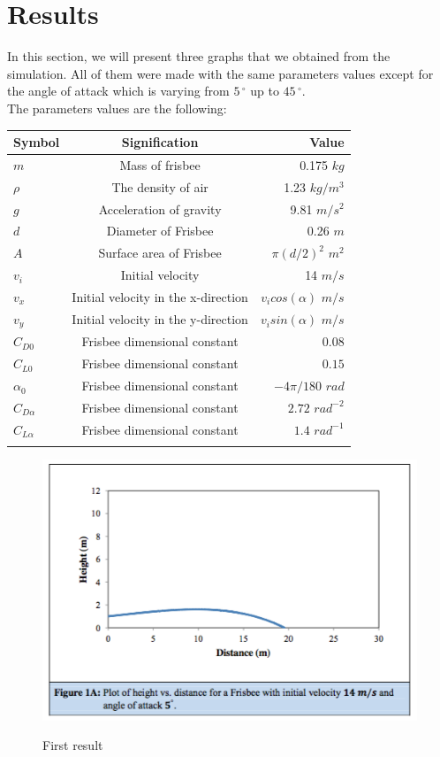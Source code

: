 \documentclass[10pt,a4paper]{report}
\begin{document}
\section{Results}
In this section, we will present three graphs that we obtained from the simulation. All of them were made with the same parameters values except for the angle of attack which is varying from $5\,^{\circ}$ up to $45\,^{\circ} $. 
\\The parameters values are the following:
\\
\begin{center}
\begin{tabular}{|l|c|r|}
  \hline
  Symbol & Signification & Value \\
  \hline
  $m$ & Mass of frisbee & 0.175 $kg$\\
  $\rho$ & The density of air & 1.23 $kg/m^3$\\
  $g$ & Acceleration of gravity & 9.81 $m/s^2$ \\
  $d$ & Diameter of Frisbee & 0.26 $m$ \\
  $A$ & Surface area of Frisbee & $\pi (d/2)^2$ $m^2$ \\
  $v_i$ & Initial velocity & 14 $m/s$ \\
  $v_x$ & Initial velocity in the x-direction & $v_icos(\alpha)$ $m/s$ \\
  $v_y$ & Initial velocity in the y-direction & $v_isin(\alpha)$ $m/s$ \\
  $C_{D0}$ & Frisbee dimensional constant & $0.08$ \\
  $C_{L0}$ & Frisbee dimensional constant & $0.15$ \\
  $\alpha_0$ & Frisbee dimensional constant & $-4\pi / 180$ $rad$ \\
  $C_{D\alpha}$ & Frisbee dimensional constant & $2.72$ $rad^{-2}$\\
  $C_{L\alpha}$ & Frisbee dimensional constant & $1.4 $ $rad^{-1}$\\
  \\
  \hline
\end{tabular}
\end{center}
\begin{figure}[H]
 \centering
\includegraphics[scale=0.6]{graph1.jpg}
\caption{First result}\cite{art5}
\label{First result}
\end{figure}
\end{document}
